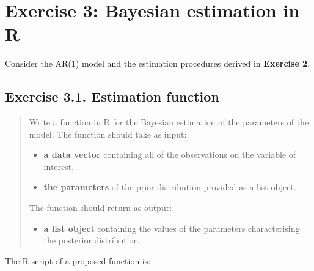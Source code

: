 \documentclass[
  letterpaper,
  DIV=11,
  numbers=noendperiod]{scrreprt}
\providecommand{\tightlist}{%
  \setlength{\itemsep}{0pt}\setlength{\parskip}{0pt}}\usepackage{longtable,booktabs,array}
\begin{document}
\hypertarget{exercise-3-bayesian-estimation-in-r}{%
\section*{Exercise 3: Bayesian estimation in
R}\label{exercise-3-bayesian-estimation-in-r}}

Consider the AR(1) model and the estimation procedures derived in
\textbf{Exercise 2}.

\hypertarget{exercise-3.1.-estimation-function}{%
\subsection*{Exercise 3.1. Estimation
function}\label{exercise-3.1.-estimation-function}}

\begin{quote}
Write a function in R for the Bayesian estimation of the parameters of
the model. The function should take as input:

\begin{itemize}
\tightlist
\item
  \textbf{a data vector} containing all of the observations on the
  variable of interest,
\item
  \textbf{the parameters} of the prior distribution provided as a list
  object.
\end{itemize}

The function should return as output:

\begin{itemize}
\tightlist
\item
  \textbf{a list object} containing the values of the parameters
  characterising the posterior distribution.
\end{itemize}
\end{quote}

The R script of a proposed function is:
\end{document}
